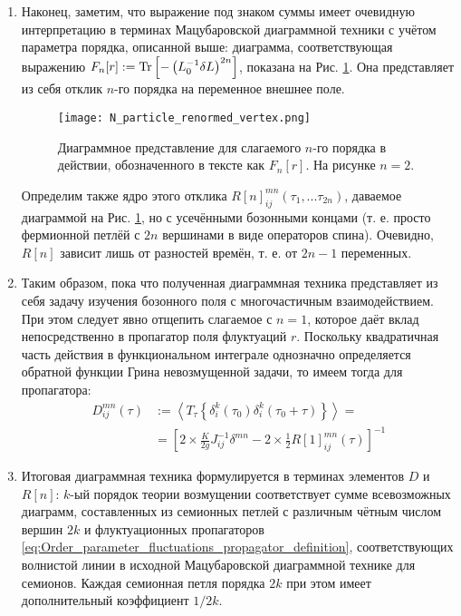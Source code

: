 \begin{enumerate}
	\item Наконец, заметим, что выражение под знаком суммы имеет очевидную интерпретацию в терминах Мацубаровской диаграммной техники с учётом параметра порядка, описанной выше: диаграмма, соответствующая выражению $F_n[r] := \operatorname{Tr} \left[- \left(L_0^{-1} \delta L \right)^{2 n}\right]$,  показана на Рис. \ref{fig:n_particle_renormed_vertex}. Она представляет из себя отклик $n$-го порядка на переменное внешнее поле. 
	\begin{figure}[h]
		\label{fig:n_particle_renormed_vertex}
		\centering
		\texttt{[image: N\_particle\_renormed\_vertex.png]}
		\caption{Диаграммное представление для слагаемого $n$-го порядка в действии, обозначенного в тексте как $F_n[r]$. На рисунке $n = 2$.}
	\end{figure}
	Определим также ядро этого отклика $R[n]_{ij}^{mn}\left(\tau_1,...\tau_{2n}\right)$, даваемое диаграммой на Рис. \ref{fig:n_particle_renormed_vertex}, но с усечёнными бозонными концами (т. е. просто фермионной петлёй с $2n$ вершинами в виде операторов спина). Очевидно, $R[n]$ зависит лишь от разностей времён, т. е. от $2n-1$ переменных.
	
	\item Таким образом, пока что полученная диаграммная техника представляет из себя задачу изучения бозонного поля с многочастичным взаимодействием. При этом следует явно отщепить слагаемое с $n = 1$, которое даёт вклад непосредственно в пропагатор поля флуктуаций $r$. Поскольку квадратичная часть действия в функциональном интеграле однозначно определяется обратной функции Грина невозмущенной задачи, то имеем тогда для пропагатора:
	\begin{equation}
	\label{eq:Order_parameter_fluctuations_propagator_definition}
		\begin{split}
			D^{mn}_{ij}(\tau) & := \left\langle T_\tau \left\{ \delta^k_i(\tau_0)    	\delta^k_i(\tau_0 + \tau) \right\} \right\rangle = \\
			& = \left[ 2 \times \frac{K}{2g} J_{ij}^{-1} \delta^{mn} - 2 \times \frac{1}{2} R[1]_{ij}^{mn}(\tau) \right]^{-1}
		\end{split}
	\end{equation}
	
	\item Итоговая диаграммная техника формулируется в терминах элементов $D$ и $R[n]$: $k$-ый порядок теории возмущении соответствует сумме всевозможных диаграмм, составленных из семионных петлей с различным чётным числом вершин $2k$ и флуктуационных пропагаторов \eqref{eq:Order_parameter_fluctuations_propagator_definition}, соответствующих волнистой линии в исходной Мацубаровской диаграммной технике для семионов. Каждая семионная петля порядка $2k$ при этом имеет дополнительный коэффициент $1/{2k}$.
\end{enumerate}  

